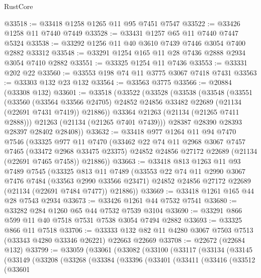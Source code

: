 \begin{lexlean}{RustCore}
\begin{coremodule}
@33518 := @33418 @1258 @1265 @11 @95 @7451 @7547
@33522 := @33426 @1258 @11 @7440 @7449
@33528 := @33431 @1257 @65 @11 @7440 @7447 @5324
@33538 := @33292 @1256 @11 @40 @3610 @7439 @7446 @3054 @7400 @2882 @33312
@33548 := @33291 @1254 @165 @11 @28 @7436 @2888 @2934 @3054 @7410 @2882
@33551 := @33325 @1254 @11 @7436
@33553 := @33331 @202 @22
@33560 := @33553 @198 @74 @11 @3775 @3067 @7418 @7431
@33563 := @33303 @132 @23 @132
@33564 := @33563 @3775
@33566 := @20884 (@33308 @132)
@33601 := @33518
    (@33522
      (@33528
        (@33538
          (@33548
            (@33551
              (@33560
                (@33564 @33566 @24705)
                @24852
                @24856
                @33482
                @22689
                (@21134 (@22691 @7431 @7419))
                @21886))
            @33364
            @21263
            (@21134 (@21265 @7411 @2888)))
          @21263
          (@21134 (@21265 @7401 @7439)))
        @28387
        @28390
        @28393
        @28397
        @28402
        @28408))
@33632 := @33418
    @977
    @1264
    @11
    @94
    @7470
    @7546
    (@33325
      @977
      @11
      @7470
      (@33462
        @22
        @74
        @11
        @2968
        @3067
        @7457
        @7465
        (@33472 @2968 @33475 @23375)
        @24852
        @24856
        @27172
        @22689
        (@21134 (@22691 @7465 @7458))
        @21886))
@33663 := @33418
    @813
    @1263
    @11
    @93
    @7489
    @7545
    (@33325
      @813
      @11
      @7489
      (@33553
        @22
        @74
        @11
        @2990
        @3067
        @7476
        @7484
        (@33563 @2990 @33566 @23471)
        @24852
        @24856
        @27172
        @22689
        (@21134 (@22691 @7484 @7477))
        @21886))
@33669 := @33418 @1261 @165 @44 @28 @7543 @2934
@33673 := @33426 @1261 @44 @7532 @7541
@33680 := @33282 @284 @1260 @65 @44 @7532 @7539 @3104
@33690 := @33291 @866 @599 @11 @40 @7518 @7531 @7538 @3054 @7494 @2882
@33693 := @33325 @866 @11 @7518
@33706 := @33333 @132 @82 @11 @4280 @3067 @7503 @7513 (@33343 @4280 @33346 @26221) @22663 @22669
@33708 := @22672 (@22684 @132)
@33799 := @33059
    (@33061
      (@33082
        (@33100
          (@33117
            (@33134
              (@33145
                (@33149
                  (@33208
                    (@33268
                      (@33384
                        (@33396
                          (@33401
                            (@33411
                              (@33416
                                (@33512
                                  (@33601

\end{coremodule}
\end{lexlean}
